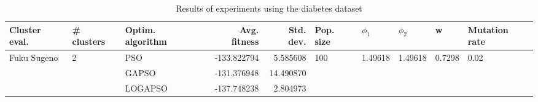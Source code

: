 \begin{table}
\centering
\caption{Results of experiments using the diabetes dataset}
\begin{tabular}{lllrrlllll}
\toprule
               Cluster eval. &        \# clusters & Optim. algorithm &  Avg. fitness &  Std. dev. &            Pop. size &               $\phi_{1}$ &               $\phi_{2}$ &                       w &         Mutation rate \\
\midrule
\multirow{3}{*}{Fuku Sugeno} & \multirow{3}{*}{2} &              PSO &   -133.822794 &   5.585608 & \multirow{3}{*}{100} & \multirow{3}{*}{1.49618} & \multirow{3}{*}{1.49618} & \multirow{3}{*}{0.7298} & \multirow{3}{*}{0.02} \\
                             &                    &            GAPSO &   -131.376948 &  14.490870 &                      &                          &                          &                         &                       \\
                             &                    &          LOGAPSO &   -137.748238 &   2.804973 &                      &                          &                          &                         &                       \\
\bottomrule
\end{tabular}
\end{table}
